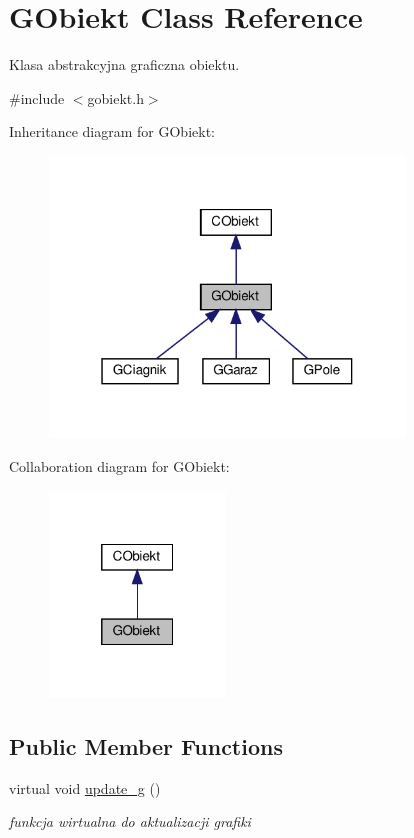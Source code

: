 \hypertarget{class_g_obiekt}{}\section{G\+Obiekt Class Reference}
\label{class_g_obiekt}


Klasa abstrakcyjna graficzna obiektu.  




{\ttfamily \#include $<$gobiekt.\+h$>$}



Inheritance diagram for G\+Obiekt\+:\nopagebreak
\begin{figure}[H]
\begin{center}
\leavevmode
\includegraphics[width=268pt]{class_g_obiekt__inherit__graph}
\end{center}
\end{figure}


Collaboration diagram for G\+Obiekt\+:\nopagebreak
\begin{figure}[H]
\begin{center}
\leavevmode
\includegraphics[width=133pt]{class_g_obiekt__coll__graph}
\end{center}
\end{figure}
\subsection*{Public Member Functions}
\begin{DoxyCompactItemize}
\item 
\mbox{\label{class_g_obiekt_acddaf8faec1ba068bce634fef949042b}} 
virtual void \mbox{\hyperlink{class_g_obiekt_acddaf8faec1ba068bce634fef949042b}{update\+\_\+g}} ()
\begin{DoxyCompactList}\small\item\em funkcja wirtualna do aktualizacji grafiki \end{DoxyCompactList}\end{DoxyCompactItemize}
